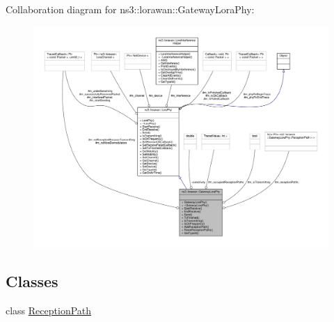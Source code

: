 Collaboration diagram for ns3\+:\+:lorawan\+:\+:Gateway\+Lora\+Phy\+:
\nopagebreak
\begin{figure}[H]
\begin{center}
\leavevmode
\includegraphics[width=350pt]{classns3_1_1lorawan_1_1GatewayLoraPhy__coll__graph}
\end{center}
\end{figure}
\subsection*{Classes}
\begin{DoxyCompactItemize}
\item 
class \hyperlink{classns3_1_1lorawan_1_1GatewayLoraPhy_1_1ReceptionPath}{Reception\+Path}
\end{DoxyCompactItemize}
